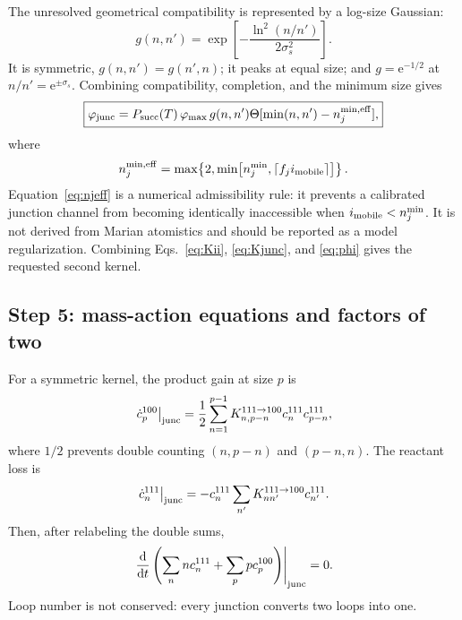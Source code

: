 \documentclass[11pt,a4paper]{article}
\newcommand{\dd}{\mathrm d}
\newcommand{\e}{\mathrm e}
\begin{document}
The unresolved geometrical compatibility is represented by a log-size Gaussian:
\begin{equation}
 g(n,n')=\exp\!\left[-\frac{\ln^2(n/n')}{2\sigma_s^2}\right].          \label{eq:gsize}
\end{equation}
It is symmetric, $g(n,n')=g(n',n)$; it peaks at equal size; and
$g=\e^{-1/2}$ at $n/n'=\e^{\pm\sigma_s}$.  Combining compatibility,
completion, and the minimum size gives
\begin{equation}
 \boxed{
 \varphi_{\rm junc}=P_{\rm succ}(T)\,\varphi_{\max}\,g(n,n')
 \Theta[\min(n,n')-n_{j}^{\min,\rm eff}],}                            \label{eq:phi}
\end{equation}
where
\begin{equation}
 n_j^{\min,\rm eff}=\max\!\left\{2,
 \min\!\left[n_j^{\min},\left\lceil f_j i_{\rm mobile}\right\rceil\right]\right\}. \label{eq:njeff}
\end{equation}
Equation~\eqref{eq:njeff} is a numerical admissibility rule: it prevents a
calibrated junction channel from becoming identically inaccessible when
$i_{\rm mobile}<n_j^{\min}$.  It is not derived from Marian atomistics and should
be reported as a model regularization.  Combining Eqs.~\eqref{eq:Kii},
\eqref{eq:Kjunc}, and \eqref{eq:phi} gives the requested second kernel.

\subsection{Step 5: mass-action equations and factors of two}

For a symmetric kernel, the product gain at size $p$ is
\begin{equation}
 \left.\dot c_p^{100}\right|_{\rm junc}
 =\frac12\sum_{n=1}^{p-1}K_{n,p-n}^{111\rightarrow100}
 c_n^{111}c_{p-n}^{111},                                               \label{eq:jgain}
\end{equation}
where $1/2$ prevents double counting $(n,p-n)$ and $(p-n,n)$.  The reactant loss is
\begin{equation}
 \left.\dot c_n^{111}\right|_{\rm junc}
 =-c_n^{111}\sum_{n'}K_{nn'}^{111\rightarrow100}c_{n'}^{111}.         \label{eq:jloss}
\end{equation}
Then, after relabeling the double sums,
\begin{equation}
 \left.\frac{\dd}{\dd t}
 \left(\sum_n nc_n^{111}+\sum_p pc_p^{100}\right)\right|_{\rm junc}=0. \label{eq:jcons}
\end{equation}
Loop number is not conserved: every junction converts two loops into one.
\end{document}

